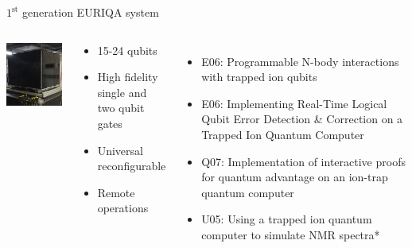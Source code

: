 \documentclass{beamer}
\begin{document}


\begin{frame}{$1^{\text{st}}$ generation EURIQA system}
  \begin{center}
    \begin{columns}
      \column{5.2cm}
      \includegraphics[width=5cm]{imgs/Breadboard_box}
      \column{6.3cm}
      \begin{block}{}
        \begin{itemize}
        \item 15-24 qubits
        \item High fidelity single and two qubit gates
        \item Universal reconfigurable
        \item Remote operations
        \end{itemize}
      \end{block}
      {
        \scriptsize
        \begin{itemize}
        \item E06: Programmable N-body interactions with trapped ion qubits
        \item E06: Implementing Real-Time Logical Qubit Error Detection \&
          Correction on a Trapped Ion Quantum Computer
        \item Q07: Implementation of interactive proofs for quantum advantage
          on an ion-trap quantum computer
        \item U05: Using a trapped ion quantum computer to simulate NMR spectra*
        \end{itemize}
      }
    \end{columns}
  \end{center}
\end{frame}
\end{document}
